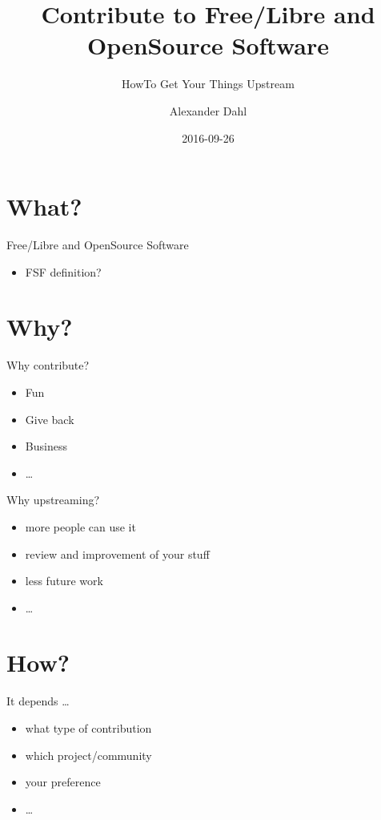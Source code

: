 \documentclass{beamer}
\title[Contrib To FLOSS]{Contribute to Free/Libre and OpenSource Software}
\subtitle{HowTo Get Your Things Upstream}
\author{Alexander Dahl}
\institute[lespocky.de]{\url{http://www.lespocky.de/}}
\date{2016-09-26}
\begin{document}
\begin{frame}
	\titlepage
\end{frame}


\section{What?}

\begin{frame}{Free/Libre and OpenSource Software}
    \begin{itemize}
        \item FSF definition?
    \end{itemize}
\end{frame}

\section{Why?}

\begin{frame}{Why contribute?}
    \begin{itemize}
        \item Fun
        \item Give back
        \item Business
        \item \dots
    \end{itemize}
\end{frame}

\begin{frame}{Why upstreaming?}
    \begin{itemize}
        \item more people can use it
        \item review and improvement of your stuff
        \item less future work
        \item \dots
    \end{itemize}
\end{frame}

\section{How?}

\begin{frame}{It depends \dots}
    \begin{itemize}
        \item what type of contribution
        \item which project/community
        \item your preference
        \item \dots
    \end{itemize}
\end{frame}
\end{document}
